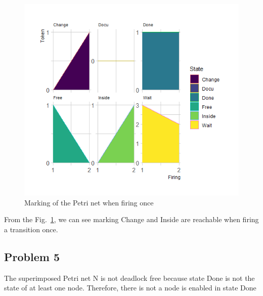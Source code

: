 \documentclass[a4paper]{article}
\begin{document}
\begin{figure}[H]
	\centering
	\includegraphics[width=12cm]{QUES4.png}
	\caption{Marking of the Petri net when firing once}
	\label{fig:q4}
\end{figure}
From the Fig.~\ref{fig:q4}, we can see marking Change and Inside are reachable when firing a transition once.
\subsection{Problem 5}
The superimposed Petri net N is not deadlock free because state Done is not the state of at least one node. Therefore, there is not a node is enabled in state Done
\end{document}
